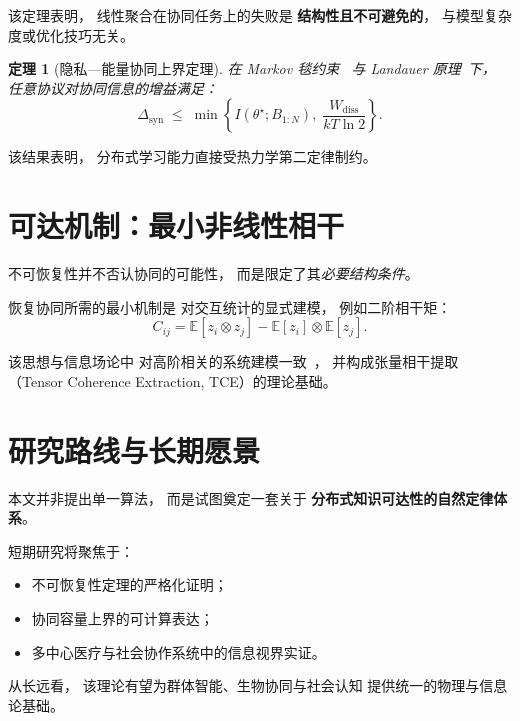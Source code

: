 \documentclass[11pt,a4paper]{article}
\newtheorem{theorem}{定理}
\newcommand{\thetaGT}{\theta^{\star}}
\newcommand{\syn}{\Delta_{\mathrm{syn}}}
\begin{document}
该定理表明，
线性聚合在协同任务上的失败是
\textbf{结构性且不可避免的}，
与模型复杂度或优化技巧无关。

\begin{theorem}[隐私—能量协同上界定理]
在 Markov 毯约束~\cite{friston2010free}
与 Landauer 原理~\cite{landauer1961irreversibility,bennett1982thermodynamics}下，
任意协议对协同信息的增益满足：
\[
\syn
\;\le\;
\min\!\left\{
I(\thetaGT;B_{1:N}),
\;\frac{W_{\mathrm{diss}}}{kT\ln 2}
\right\}.
\]
\end{theorem}

该结果表明，
分布式学习能力直接受热力学第二定律制约。

\section{可达机制：最小非线性相干}

不可恢复性并不否认协同的可能性，
而是限定了其\emph{必要结构条件}。

恢复协同所需的最小机制是
对交互统计的显式建模，
例如二阶相干矩：
\[
C_{ij}
=
\mathbb{E}[z_i \otimes z_j]
-
\mathbb{E}[z_i]\otimes\mathbb{E}[z_j].
\]

该思想与信息场论中
对高阶相关的系统建模一致~\cite{ensslin2009information}，
并构成张量相干提取
（Tensor Coherence Extraction, TCE）的理论基础。

\section{研究路线与长期愿景}

本文并非提出单一算法，
而是试图奠定一套关于
\textbf{分布式知识可达性的自然定律体系}。

短期研究将聚焦于：
\begin{itemize}
\item 不可恢复性定理的严格化证明；
\item 协同容量上界的可计算表达；
\item 多中心医疗与社会协作系统中的信息视界实证。
\end{itemize}

从长远看，
该理论有望为群体智能、生物协同与社会认知
提供统一的物理与信息论基础。



\end{document}
